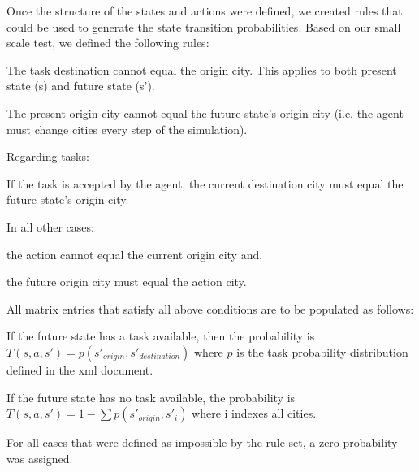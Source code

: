 \documentclass[11pt]{article}
\begin{document}
Once the structure of the states and actions were defined, we created rules that could be used to generate the state transition probabilities. Based on our small scale test, we defined the following rules:
\begin{compactenum} 
	\item The task destination cannot equal the origin city. This applies to both present state (s) and future state (s'). 
	\item The present origin city cannot equal the future state's origin city (i.e. the agent must change cities every step of the simulation). 
	\item Regarding tasks:
	\begin{compactenum}
		\item If the task is accepted by the agent, the current destination city must equal the future state's origin city.  
		\item In all other cases:
		\begin{compactenum}
			\item the action cannot equal the current origin city and,
			\item the future origin city must equal the action city.
		\end{compactenum}
	\end{compactenum}		
	\item All matrix entries that satisfy all above conditions are to be populated as follows:
	\begin{compactenum}
		\item If the future state has a task available, then the probability is $ T(s,a,s')=p(s'_{origin},s'_{destination}) $ where $p$ is the task probability distribution defined in the xml document. 
		\item If the future state has no task available, the probability is $T(s,a,s')=1-\sum p(s'_{origin},s'_{i}) $ where i indexes all cities. 
	\end{compactenum}
\end{compactenum}
For all cases that were defined as impossible by the rule set, a zero probability was assigned.\\
\end{document}
